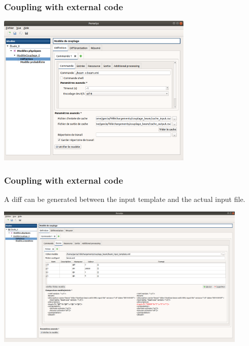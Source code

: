 \documentclass{beamer}
\begin{document}

\begin{frame}
\frametitle{Coupling with external code}

\begin{center}
\includegraphics[width=0.7\textwidth]{figures/coupling-1-Commande.png}
\end{center}

\end{frame}


\begin{frame}
\frametitle{Coupling with external code}

A diff can be generated between the input template and the actual input file.

\begin{center}
\includegraphics[width=0.9\textwidth]{figures/coupling-2-Entree.png}
\end{center}

\end{frame}
\end{document}

